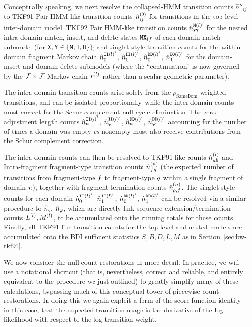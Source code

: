 Conceptually speaking, we next resolve the collapsed-HMM transition counts $\hat{n}''_{ij}$ to TKF91 Pair HMM-like transition counts $\hat{n}^{(0)}_{ij}$ for transitions in the top-level inter-domain model;
TKF92 Pair HMM-like transition counts $\hat{n}^{{\tt M}(l)'}_{{\tt X}{\tt Y}}$
for the nested intra-domain match, insert, and delete states ${\tt M}{\tt X}_{lf}$ of each domain-match submodel (for ${\tt X},{\tt Y} \in \{{\tt M},{\tt I},{\tt D}\}$);
and
singlet-style transition counts for the within-domain fragment Markov chain
$\hat{n}^{{\tt I}{\tt I}(l)'}_{0}$, $\hat{n}^{{\tt I}{\tt I}(l)'}_{1}$,
$\hat{n}^{{\tt D}{\tt D}(l)'}_{0}$, $\hat{n}^{{\tt D}{\tt D}(l)'}_{1}$
for the domain-insert and domain-delete submodels
(where the ``continuation'' is now governed by the $\mathcal{F} \times \mathcal{F}$ Markov chain
$r^{(l)}$ rather than a scalar geometric parameter).

The intra-domain transition counts arise solely from the $p_\text{SameDom}$-weighted transitions, and can be isolated proportionally, while the inter-domain counts must correct for the Schur complement null cycle elimination.
The zero-adjustment length counts
$\hat{n}^{{\tt I}{\tt I}(l)'}_{\kappa}$, $\hat{n}^{{\tt I}{\tt I}(l)'}_{\varphi}$,
$\hat{n}^{{\tt D}{\tt D}(l)'}_{\kappa}$, $\hat{n}^{{\tt D}{\tt D}(l)'}_{\varphi}$
accounting for the number of times a domain was empty {\em vs} nonempty must also receive contributions from the Schur complement correction.

The intra-domain counts can then be resolved to TKF91-like counts $\hat{n}^{(l)}_{ab}$ and
Intra-fragment fragment-type transition counts $\hat{n}^{(n)}_{fg}$ (the expected number of
transitions from fragment-type $f$ to fragment-type $g$ within a single
fragment of domain $n$),
together with fragment termination counts $\hat{n}^{(n)}_{\rho,f}$.
The singlet-style counts for each domain
$\hat{n}^{{\tt I}{\tt I}(l)'}_{0}$, $\hat{n}^{{\tt I}{\tt I}(l)'}_{1}$,
$\hat{n}^{{\tt D}{\tt D}(l)'}_{0}$, $\hat{n}^{{\tt D}{\tt D}(l)'}_{1}$
can be resolved via a similar procedure to
$\hat{n}_{\kappa}$, $\hat{n}_{\varphi}$,
which are directly link sequence extension/termination counts $L^{(l)},M^{(l)}$,
to be accumulated onto the running totals for those counts.
Finally, all TKF91-like transition counts for the top-level and nested models are accumulated onto the BDI sufficient statistics $S, B, D, L, M$ as in Section~\ref{sec:bw-tkf91}.

We now consider the null count restorations in more detail.
In practice, we will use a notational shortcut (that is, nevertheless, correct and reliable, and entirely equivalent to the procedure we just outlined)
to greatly simplify many of these calculations, bypassing much of this conceptual tower of piecewise count restorations.
In doing this we again exploit a form of the score function identity---in this case, that the expected transition usage is the derivative of the log-likelihood with respect to the log-transition weight.

